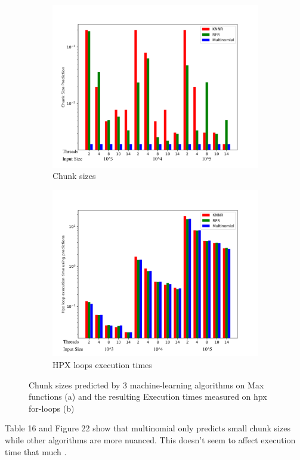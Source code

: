 \begin{figure}[h]
	\centering
	\begin{subfigure}[b]{0.5\textwidth}
		\centering
		\includegraphics[width=\textwidth]{images/bars_max_cs.pdf}
		\caption[Network2]%
		{{Chunk sizes}}    
	\end{subfigure}
	\hfill
	\begin{subfigure}[b]{0.49\textwidth}  
		\centering 
		\includegraphics[width=\textwidth]{images/bars_max_times.pdf}
		\caption[]%
		{{HPX loops execution times}}    
	\end{subfigure}
	\caption{Chunk sizes predicted by 3 machine-learning algorithms on Max functions (a) and the resulting Execution times measured on hpx for-loops (b)} 
\end{figure}
Table 16 and Figure 22 show that multinomial only predicts small chunk sizes while other algorithms are more nuanced. This doesn't seem to affect execution time that much .
\newpage
